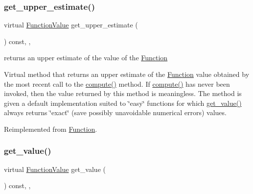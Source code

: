 \subsubsection{\texorpdfstring{get\+\_\+upper\+\_\+estimate()}{get\_upper\_estimate()}}
{\footnotesize\ttfamily virtual \mbox{\hyperlink{class_s_m_spp__di__unipi__it_1_1_function_a9ad432406b609e28d340f73e9474bffe}{Function\+Value}} get\+\_\+upper\+\_\+estimate (\begin{DoxyParamCaption}\item[{void}]{ }\end{DoxyParamCaption}) const\hspace{0.3cm}{\ttfamily [inline]}, {\ttfamily [override]}, {\ttfamily [virtual]}}



returns an upper estimate of the value of the \mbox{\hyperlink{class_s_m_spp__di__unipi__it_1_1_function}{Function}} 

Virtual method that returns an upper estimate of the \mbox{\hyperlink{class_s_m_spp__di__unipi__it_1_1_function}{Function}} value obtained by the most recent call to the \mbox{\hyperlink{class_s_m_spp__di__unipi__it_1_1_function_a504d4e3e174c7a518cc66156a8a45ce5}{compute()}} method. If \mbox{\hyperlink{class_s_m_spp__di__unipi__it_1_1_function_a504d4e3e174c7a518cc66156a8a45ce5}{compute()}} has never been invoked, then the value returned by this method is meaningless. The method is given a default implementation suited to \char`\"{}easy\char`\"{} functions for which \mbox{\hyperlink{class_s_m_spp__di__unipi__it_1_1_d_quad_function_ae74d8c7f3dc6100820de31198c77ca25}{get\+\_\+value()}} always returns \char`\"{}exact\char`\"{} (save possibly unavoidable numerical errors) values. 

Reimplemented from \mbox{\hyperlink{class_s_m_spp__di__unipi__it_1_1_function_a018379619bc05b38bdab0e225016f98f}{Function}}.

\mbox{\label{class_s_m_spp__di__unipi__it_1_1_d_quad_function_ae74d8c7f3dc6100820de31198c77ca25}} 
\subsubsection{\texorpdfstring{get\+\_\+value()}{get\_value()}}
{\footnotesize\ttfamily virtual \mbox{\hyperlink{class_s_m_spp__di__unipi__it_1_1_function_a9ad432406b609e28d340f73e9474bffe}{Function\+Value}} get\+\_\+value (\begin{DoxyParamCaption}\item[{void}]{ }\end{DoxyParamCaption}) const\hspace{0.3cm}{\ttfamily [inline]}, {\ttfamily [override]}, {\ttfamily [virtual]}}



